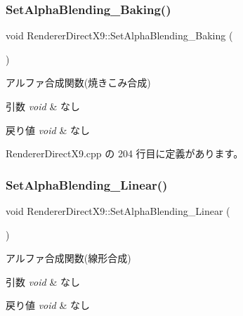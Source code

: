 \subsubsection{\texorpdfstring{Set\+Alpha\+Blending\+\_\+\+Baking()}{SetAlphaBlending\_Baking()}}
{\footnotesize\ttfamily void Renderer\+Direct\+X9\+::\+Set\+Alpha\+Blending\+\_\+\+Baking (\begin{DoxyParamCaption}{ }\end{DoxyParamCaption})}



アルファ合成関数(焼きこみ合成) 


\begin{DoxyParams}{引数}
{\em void} & なし \\
\hline
\end{DoxyParams}

\begin{DoxyRetVals}{戻り値}
{\em void} & なし \\
\hline
\end{DoxyRetVals}


 Renderer\+Direct\+X9.\+cpp の 204 行目に定義があります。

\mbox{\label{class_renderer_direct_x9_abfb5264cbb0bf3bacc7b4ec416ddc05a}} 
\subsubsection{\texorpdfstring{Set\+Alpha\+Blending\+\_\+\+Linear()}{SetAlphaBlending\_Linear()}}
{\footnotesize\ttfamily void Renderer\+Direct\+X9\+::\+Set\+Alpha\+Blending\+\_\+\+Linear (\begin{DoxyParamCaption}{ }\end{DoxyParamCaption})}



アルファ合成関数(線形合成) 


\begin{DoxyParams}{引数}
{\em void} & なし \\
\hline
\end{DoxyParams}

\begin{DoxyRetVals}{戻り値}
{\em void} & なし \\
\hline
\end{DoxyRetVals}


